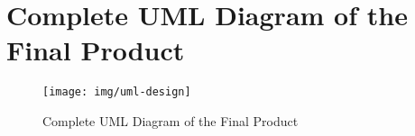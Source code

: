 \chapter{Complete UML Diagram of the Final Product}
\label{cha:uml-diagram}

\begin{figure}[h]
  \centering
  \texttt{[image: img/uml-design]}
  \caption{Complete UML Diagram of the Final Product}
  \label{fig:uml-design}
\end{figure}
